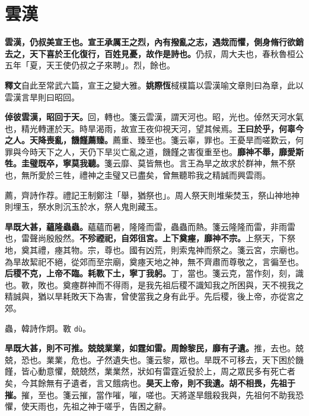 \section{雲漢}


\textbf{雲漢，仍叔美宣王也。宣王承厲王之烈，內有撥亂之志，遇烖而懼，側身脩行欲銷去之，天下喜於王化復行，百姓見憂，故作是詩也。}{\footnotesize 仍叔，周大夫也，春秋魯桓公五年「夏，天王使仍叔之子來聘」。烈，餘也。}

\begin{quoting}\textbf{釋文}自此至常武六篇，宣王之變大雅。\textbf{姚際恆}棫樸篇以雲漢喻文章則曰為章，此以雲漢言旱則曰昭回。\end{quoting}

\textbf{倬彼雲漢，昭回于天。}{\footnotesize 回，轉也。箋云雲漢，謂天河也。昭，光也。倬然天河水氣也，精光轉運於天。時旱渴雨，故宣王夜仰視天河，望其候焉。}\textbf{王曰於乎，何辜今之人。天降喪亂，饑饉薦臻。}{\footnotesize 薦重、臻至也。箋云辜，罪也。王憂旱而嗟歎云，何罪與今時天下之人，天仍下旱災亡亂之道，饑饉之害復重至也。}\textbf{靡神不舉，靡愛斯牲。圭璧既卒，寧莫我聽。}{\footnotesize 箋云靡、莫皆無也。言王為旱之故求於群神，無不祭也，無所愛於三牲，禮神之圭璧又已盡矣，曾無聽聆我之精誠而興雲雨。}

\begin{quoting}薦，齊詩作荐。禮記王制鄭注「舉，猶祭也」。周人祭天則堆柴焚玉，祭山神地神則埋玉，祭水則沉玉於水，祭人鬼則藏玉。\end{quoting}

\textbf{旱既大甚，蘊隆蟲蟲。}{\footnotesize 蘊蘊而暑，隆隆而雷，蟲蟲而熱。箋云隆隆而雷，非雨雷也，雷聲尚殷殷然。}\textbf{不殄禋祀，自郊徂宮。上下奠瘞，靡神不宗。}{\footnotesize 上祭天，下祭地，奠其禮，瘞其物。宗，尊也。國有凶荒，則索鬼神而祭之。箋云宮，宗廟也。為旱故絜祀不絕，從郊而至宗廟，奠瘞天地之神，無不齊肅而尊敬之，言徧至也。}\textbf{后稷不克，上帝不臨。耗斁下土，寧丁我躬。}{\footnotesize 丁，當也。箋云克，當作刻，刻，識也。斁，敗也。奠瘞群神而不得雨，是我先祖后稷不識知我之所困與，天不視我之精誠與，猶以旱耗敗天下為害，曾使當我之身有此乎。先后稷，後上帝，亦從宮之郊。}

\begin{quoting}蟲，韓詩作炯。斁 \texttt{dù}。\end{quoting}

\textbf{旱既大甚，則不可推。兢兢業業，如霆如雷。周餘黎民，靡有孑遺。}{\footnotesize 推，去也。兢兢，恐也。業業，危也。孑然遺失也。箋云黎，眾也。旱既不可移去，天下困於饑饉，皆心動意懼，兢兢然，業業然，狀如有雷霆近發於上，周之眾民多有死亡者矣，今其餘無有孑遺者，言又餓病也。}\textbf{昊天上帝，則不我遺。胡不相畏，先祖于摧。}{\footnotesize 摧，至也。箋云摧，當作嗺，嗺，嗟也。天將遂旱餓殺我與，先祖何不助我恐懼，使天雨也，先祖之神于嗟乎，告困之辭。}

